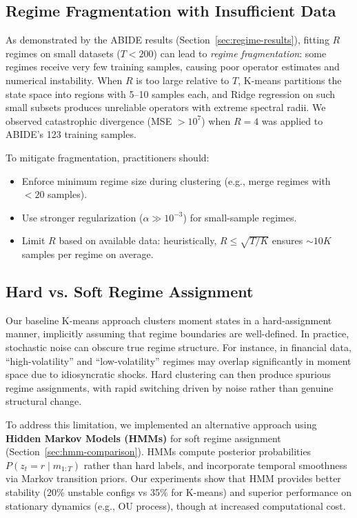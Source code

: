 \documentclass[journal, onecolumn]{IEEEtran}
\begin{document}
\subsection{Regime Fragmentation with Insufficient Data}

As demonstrated by the ABIDE results (Section~\ref{sec:regime-results}), fitting $R$ regimes on small datasets ($T < 200$) can lead to \emph{regime fragmentation}: some regimes receive very few training samples, causing poor operator estimates and numerical instability. When $R$ is too large relative to $T$, K-means partitions the state space into regions with 5--10 samples each, and Ridge regression on such small subsets produces unreliable operators with extreme spectral radii. We observed catastrophic divergence (MSE $> 10^7$) when $R=4$ was applied to ABIDE's 123 training samples.

To mitigate fragmentation, practitioners should:
\begin{itemize}
    \item Enforce minimum regime size during clustering (e.g., merge regimes with $< 20$ samples).
    \item Use stronger regularization ($\alpha \gg 10^{-3}$) for small-sample regimes.
    \item Limit $R$ based on available data: heuristically, $R \le \sqrt{T/K}$ ensures $\sim 10K$ samples per regime on average.
\end{itemize}

\subsection{Hard vs. Soft Regime Assignment}

Our baseline K-means approach clusters moment states in a hard-assignment manner, implicitly assuming that regime boundaries are well-defined. In practice, stochastic noise can obscure true regime structure. For instance, in financial data, ``high-volatility'' and ``low-volatility'' regimes may overlap significantly in moment space due to idiosyncratic shocks. Hard clustering can then produce spurious regime assignments, with rapid switching driven by noise rather than genuine structural change.

To address this limitation, we implemented an alternative approach using \textbf{Hidden Markov Models (HMMs)} for soft regime assignment (Section~\ref{sec:hmm-comparison}). HMMs compute posterior probabilities $P(z_t = r \mid m_{1:T})$ rather than hard labels, and incorporate temporal smoothness via Markov transition priors. Our experiments show that HMM provides better stability (20\% unstable configs vs 35\% for K-means) and superior performance on stationary dynamics (e.g., OU process), though at increased computational cost.
\end{document}
